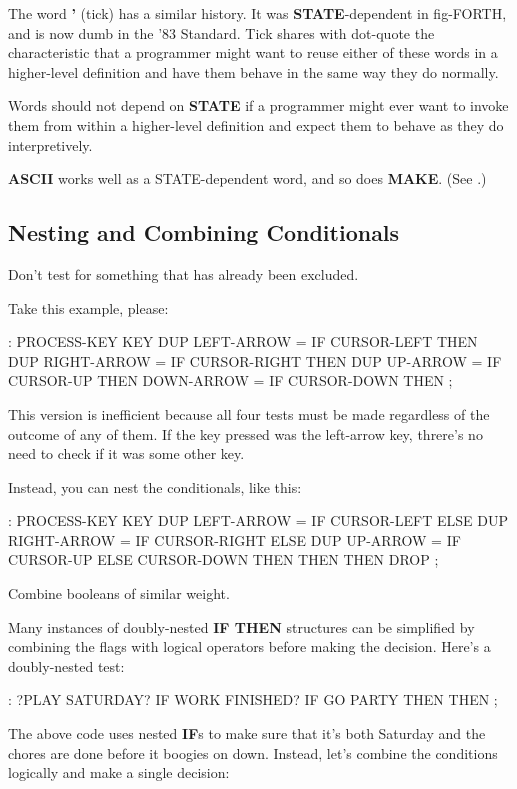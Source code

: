 The word \textbf{'} (tick) has a similar history. It was \textbf{STATE}-dependent in
fig-FORTH, and is now dumb in the '83 Standard. Tick shares with
dot-quote the characteristic that a programmer might want to reuse either of
these words in a higher-level definition and have them behave in the same
way they do normally.

\begin{tip}
Words should not depend on \textbf{STATE} if a programmer might ever want to
invoke them from within a higher-level definition and expect them to
behave as they do interpretively.
\end{tip}
\textbf{ASCII} works well as a STATE-dependent word, and so does \textbf{MAKE}.
(See .)

\subsection{Nesting and Combining Conditionals}
\begin{tip}
Don't test for something that has already been excluded.
\end{tip}
Take this example, please:

\begin{Code}
: PROCESS-KEY
   KEY  DUP  LEFT-ARROW  =  IF CURSOR-LEFT  THEN
        DUP  RIGHT-ARROW =  IF CURSOR-RIGHT THEN
        DUP  UP-ARROW    =  IF CURSOR-UP    THEN
             DOWN-ARROW  =  IF CURSOR-DOWN  THEN ;
\end{Code}
This version is inefficient because all four tests must be made regardless
of the outcome of any of them. If the key pressed was the left-arrow key,
threre's no need to check if it was some other key.

Instead, you can nest the conditionals, like this:

\begin{Code}
: PROCESS-KEY
   KEY  DUP  LEFT-ARROW  =  IF CURSOR-LEFT  ELSE
        DUP  RIGHT-ARROW =  IF CURSOR-RIGHT ELSE
        DUP  UP-ARROW    =  IF CURSOR-UP    ELSE
                               CURSOR-DOWN
           THEN THEN THEN  DROP ;
\end{Code}
\begin{tip}
Combine booleans of similar weight.
\end{tip}
Many instances of doubly-nested \textbf{IF THEN} structures can be simplified
by combining the flags with logical operators before making the decision.
Here's a doubly-nested test:

\begin{Code}
: ?PLAY   SATURDAY? IF  WORK FINISHED? IF
     GO PARTY  THEN  THEN ;
\end{Code}
The above code uses nested \textbf{IF}s to make sure that it's both Saturday and
the chores are done before it boogies on down. Instead, let's combine the
conditions logically and make a single decision:

